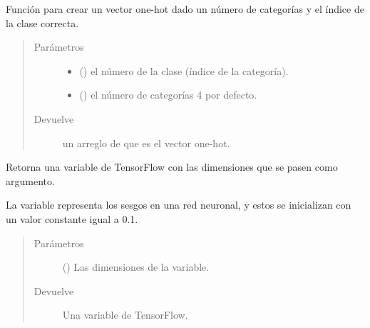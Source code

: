 \begin{fulllineitems}
\label{\detokenize{model_desc:cnn_indoor_classifier_model.hot_encoding_from_category}}
Función para crear un vector one-hot dado un número de
categorías y el índice de la clase correcta.
\begin{quote}\begin{description}
\item[{Parámetros}] \leavevmode\begin{itemize}
\item {} 
 () \textendash{} el número de la clase (índice de la categoría).

\item {} 
 () \textendash{} el número de categorías 4 por defecto.

\end{itemize}

\item[{Devuelve}] \leavevmode
un arreglo de  que es el vector one-hot.

\end{description}\end{quote}

\end{fulllineitems}


\begin{fulllineitems}
\label{\detokenize{model_desc:cnn_indoor_classifier_model.init_bias}}
Retorna una variable de TensorFlow con las dimensiones 
que se pasen como argumento.

La variable representa los sesgos en una red neuronal,
y estos se inicializan con un valor constante igual a 0.1.
\begin{quote}\begin{description}
\item[{Parámetros}] \leavevmode
{} () \textendash{} Las dimensiones de la variable.

\item[{Devuelve}] \leavevmode
Una variable de TensorFlow.

\end{description}\end{quote}

\end{fulllineitems}

